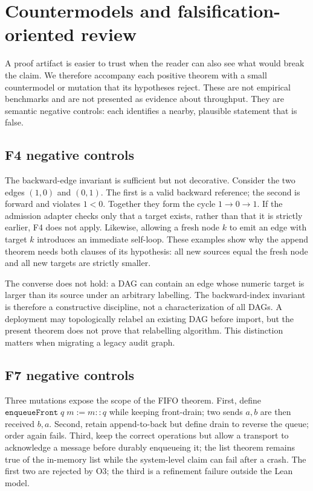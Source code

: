 \documentclass[11pt,letterpaper]{article}
\theoremstyle{definition}
\begin{document}
\section{Countermodels and falsification-oriented review}
\label{sec:countermodels}

A proof artifact is easier to trust when the reader can also see what would
break the claim. We therefore accompany each positive theorem with a small
countermodel or mutation that its hypotheses reject. These are not empirical
benchmarks and are not presented as evidence about throughput. They are
semantic negative controls: each identifies a nearby, plausible statement that
is false.

\subsection{F4 negative controls}

The backward-edge invariant is sufficient but not decorative. Consider the two
edges $(1,0)$ and $(0,1)$. The first is a valid backward reference; the second
is forward and violates $1<0$. Together they form the cycle
$1\rightarrow0\rightarrow1$. If the admission adapter checks only that a target
exists, rather than that it is strictly earlier, F4 does not apply. Likewise,
allowing a fresh node $k$ to emit an edge with target $k$ introduces an immediate
self-loop. These examples show why the append theorem needs both clauses of
its hypothesis: all new sources equal the fresh node and all new targets are
strictly smaller.

The converse does not hold: a DAG can contain an edge whose numeric target is
larger than its source under an arbitrary labelling. The backward-index
invariant is therefore a constructive discipline, not a characterization of
all DAGs. A deployment may topologically relabel an existing DAG before import,
but the present theorem does not prove that relabelling algorithm. This
distinction matters when migrating a legacy audit graph.

\subsection{F7 negative controls}

Three mutations expose the scope of the FIFO theorem. First, define
$\texttt{enqueueFront}\;q\;m := m::q$ while keeping front-drain; two sends
$a,b$ are then received $b,a$. Second, retain append-to-back but define drain to
reverse the queue; order again fails. Third, keep the correct operations but
allow a transport to acknowledge a message before durably enqueueing it; the
list theorem remains true of the in-memory list while the system-level claim
can fail after a crash. The first two are rejected by O3; the third is a
refinement failure outside the Lean model.
\end{document}
